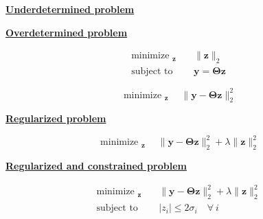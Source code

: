 \documentclass[aspectratio=169, usenames, dvipsnames]{beamer}
\DeclareMathOperator*{\minimize}{minimize~}
\DeclareMathOperator*{\subto}{subject~to~}
\begin{document}
\begin{frame}
  \vfill
  \begin{minipage}{.48\textwidth}
    \centering
    \underline{\textbf{Underdetermined problem}}
  \end{minipage}%
  \hfill
  \begin{minipage}{.48\textwidth}
    \centering
    \underline{\textbf{Overdetermined problem}}
  \end{minipage}

  \bigskip

  \begin{minipage}{.48\textwidth}
    \large
    \[
    \begin{aligned}
      \minimize_{\bm{z}} & \quad \| \bm{z} \|_2 \\
      \subto & \quad \bm{y} = \boldsymbol{\Theta} \bm{z}
    \end{aligned}
    \]
  \end{minipage}%
  \hfill
  \begin{minipage}{.48\textwidth}
    \large
    \[
    \minimize_{\bm{z}} \quad \| \bm{y} - \boldsymbol{\Theta} \bm{z} \|_2^2
    \]
  \end{minipage}

  \vfill
\end{frame}

\begin{frame}
  \vfill
  \centering
  \underline{\textbf{Regularized problem}}


  \large
  \[
  \minimize_{\bm{z}} \quad \| \bm{y} - \boldsymbol{\Theta} \bm{z} \|_2^2 + \lambda \| \bm{z} \|_2^2
  \]
  \vfill
\end{frame}

\begin{frame}
  \vfill
  \centering
  \underline{\textbf{Regularized and constrained problem}}


  \large
  \[
  \begin{aligned}
    \minimize_{\bm{z}} & \quad \| \bm{y} - \boldsymbol{\Theta} \bm{z} \|_2^2 + \lambda \| \bm{z} \|_2^2 \\
    \subto & \quad \vert z_i \vert \leq 2 \sigma_i \quad \forall \ i
  \end{aligned}
  \]
  \vfill
\end{frame}
\end{document}
